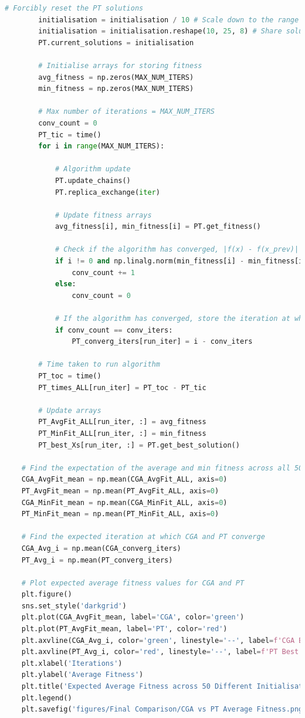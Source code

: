 \documentclass[10pt]{article}
\begin{document}
\begin{lstlisting}[language=Python, caption=FinalComparison.py, label=FinalComparisonpy]
        # Forcibly reset the PT solutions
        initialisation = initialisation / 10 # Scale down to the range of the PT algorithm (0-1) 
        initialisation = initialisation.reshape(10, 25, 8) # Share solutions between replicas, i.e. from shape: (250, 8) to (10, 25, 8)
        PT.current_solutions = initialisation
    
        # Initialise arrays for storing fitness
        avg_fitness = np.zeros(MAX_NUM_ITERS)
        min_fitness = np.zeros(MAX_NUM_ITERS)
    
        # Max number of iterations = MAX_NUM_ITERS
        conv_count = 0
        PT_tic = time()
        for i in range(MAX_NUM_ITERS):
            
            # Algorithm update
            PT.update_chains()
            PT.replica_exchange(iter)
    
            # Update fitness arrays
            avg_fitness[i], min_fitness[i] = PT.get_fitness()
    
            # Check if the algorithm has converged, |f(x) - f(x_prev)| < eps for 'conv_iters' iterations
            if i != 0 and np.linalg.norm(min_fitness[i] - min_fitness[i-1]) < eps:
                conv_count += 1
            else:
                conv_count = 0
    
            # If the algorithm has converged, store the iteration at which it converged
            if conv_count == conv_iters:
                PT_converg_iters[run_iter] = i - conv_iters
    
        # Time taken to run algorithm
        PT_toc = time()
        PT_times_ALL[run_iter] = PT_toc - PT_tic
    
        # Update arrays
        PT_AvgFit_ALL[run_iter, :] = avg_fitness
        PT_MinFit_ALL[run_iter, :] = min_fitness
        PT_best_Xs[run_iter, :] = PT.get_best_solution()
    
    # Find the expectation of the average and min fitness across all 50 initialisations
    CGA_AvgFit_mean = np.mean(CGA_AvgFit_ALL, axis=0)
    PT_AvgFit_mean = np.mean(PT_AvgFit_ALL, axis=0)
    CGA_MinFit_mean = np.mean(CGA_MinFit_ALL, axis=0)
    PT_MinFit_mean = np.mean(PT_MinFit_ALL, axis=0)
    
    # Find the expected iteration at which CGA and PT converge
    CGA_Avg_i = np.mean(CGA_converg_iters)
    PT_Avg_i = np.mean(PT_converg_iters)
    
    # Plot expected average fitness values for CGA and PT
    plt.figure()
    sns.set_style('darkgrid')
    plt.plot(CGA_AvgFit_mean, label='CGA', color='green')
    plt.plot(PT_AvgFit_mean, label='PT', color='red')
    plt.axvline(CGA_Avg_i, color='green', linestyle='--', label=f'CGA Best Converges at {int(CGA_Avg_i)} Iterations')
    plt.axvline(PT_Avg_i, color='red', linestyle='--', label=f'PT Best Convergence at {int(PT_Avg_i)} Iterations')
    plt.xlabel('Iterations')
    plt.ylabel('Average Fitness')
    plt.title('Expected Average Fitness across 50 Different Initialisations')
    plt.legend()
    plt.savefig('figures/Final Comparison/CGA vs PT Average Fitness.png', dpi=300)
    

\end{lstlisting}
\end{document}
